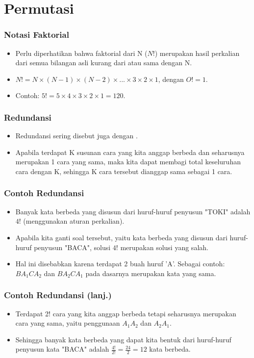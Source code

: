 \section{Permutasi}
\frame{\sectionpage}

\begin{frame}
\frametitle{Notasi Faktorial}
\begin{itemize}
  \item Perlu diperhatikan bahwa faktorial dari N ($N!$) merupakan hasil perkalian dari semua bilangan asli kurang dari atau sama dengan N.
  \item $N! = N \times (N-1) \times (N-2) \times ... \times 3 \times 2 \times 1$, dengan $O! = 1$.
  \item Contoh: $5! = 5 \times 4 \times 3 \times 2 \times 1 = 120$.
\end{itemize}
\end{frame}

\begin{frame}
\frametitle{Redundansi}
\begin{itemize}
  \item Redundansi sering disebut juga dengan .
  \item Apabila terdapat K susunan cara yang kita anggap berbeda dan seharusnya merupakan 1 cara yang sama, maka kita dapat membagi total keseluruhan cara dengan K, sehingga K cara tersebut dianggap sama sebagai 1 cara.
\end{itemize}
\end{frame}

\begin{frame}
\frametitle{Contoh Redundansi}
\begin{itemize}
  \item Banyak kata berbeda yang disusun dari huruf-huruf penyusun "TOKI" adalah $4!$ (menggunakan aturan perkalian).
  \item Apabila kita ganti soal tersebut, yaitu kata berbeda yang disusun dari huruf-huruf penyusun "BACA", solusi $4!$ merupakan solusi yang salah.
  \item Hal ini disebabkan karena terdapat 2 buah huruf 'A'. Sebagai contoh: $BA_{1}CA_{2}$ dan $BA_{2}CA_{1}$ pada dasarnya merupakan kata yang sama.
\end{itemize}
\end{frame}

\begin{frame}
\frametitle{Contoh Redundansi (lanj.)}
\begin{itemize}
  \item Terdapat 2! cara yang kita anggap berbeda tetapi seharusnya merupakan cara yang sama, yaitu penggunaan $A_{1}A_{2}$ dan $A_{2}A_{1}$.
  \item Sehingga banyak kata berbeda yang dapat kita bentuk dari huruf-huruf penyusun kata "BACA" adalah $\frac{4!}{2!} = \frac{24}{2} = 12$ kata berbeda.
\end{itemize}
\end{frame}

